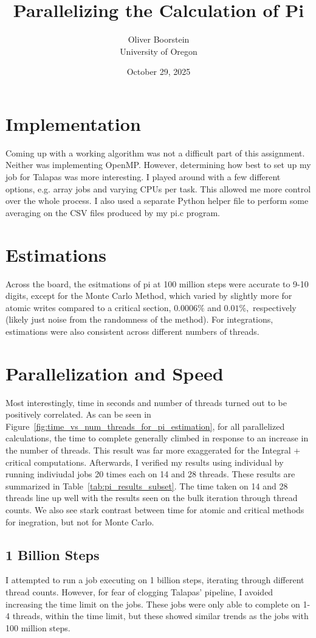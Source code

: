 \documentclass[11pt]{article}
\title{Parallelizing the Calculation of Pi}
\author{Oliver Boorstein \\ University of Oregon}
\date{October 29, 2025}
\begin{document}
\twocolumn[
  \maketitle
  \vspace{-1em}
]
\section{Implementation}
Coming up with a working algorithm was not a difficult part of this assignment. Neither was implementing OpenMP. However, determining how best to set up my job for Talapas was more interesting. I played around with a few different options, e.g. array jobs and varying CPUs per task. This allowed me more control over the whole process. I also used a separate Python helper file to perform some averaging on the CSV files produced by my pi.c program.
\section{Estimations}
Across the board, the esitmations of pi at 100 million steps were accurate to 9-10 digits, except for the Monte Carlo Method, which varied by slightly more for atomic writes compared to a critical section, $0.0006\%$ and $0.01\%,$ respectively (likely just noise from the randomness of the method). For integrations, estimations were also consistent across different numbers of threads.
\section{Parallelization and Speed}
Most interestingly, time in seconds and number of threads turned out to be positively correlated. As can be seen in Figure~\ref{fig:time_vs_num_threads_for_pi_estimation}, for all parallelized calculations, the time to complete generally climbed in response to an increase in the number of threads. This result was far more exaggerated for the Integral + critical computations. Afterwards, I verified my results using individual by running indiviudal jobs 20 times each on 14 and 28 threads. These results are summarized in Table~\ref{tab:pi_results_subset}. The time taken on 14 and 28 threads line up well with the results seen on the bulk iteration through thread counts. We also see stark contrast between time for atomic and critical methods for inegration, but not for Monte Carlo.
\subsection{1 Billion Steps}
I attempted to run a job executing on 1 billion steps, iterating through different thread counts. However, for fear of clogging Talapas' pipeline, I avoided increasing the time limit on the jobs. These jobs were only able to complete on 1-4 threads, within the time limit, but these showed similar trends as the jobs with 100 million steps.
\end{document}
